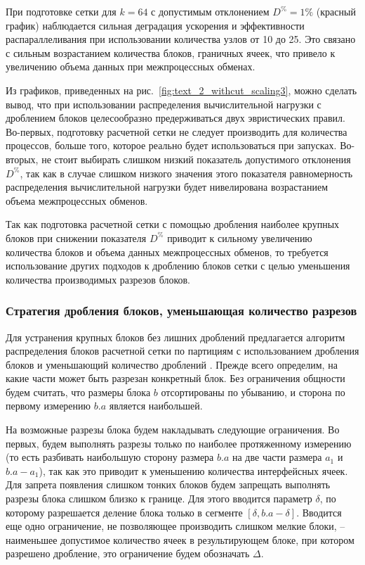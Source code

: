 При подготовке сетки для $k = 64$ с допустимым отклонением $D^{\%} = 1\%$ (красный график) наблюдается сильная деградация ускорения и эффективности распараллеливания при использовании количества узлов от 10 до 25.
Это связано с сильным возрастанием количества блоков, граничных ячеек, что привело к увеличению объема данных при межпроцессных обменах.

Из графиков, приведенных на рис.~\ref{fig:text_2_withcut_scaling3}, можно сделать вывод, что при использовании распределения вычислительной нагрузки с дроблением блоков целесообразно предерживаться двух эвристических правил.
Во-первых, подготовку расчетной сетки не следует производить для количества процессов, больше того, которое реально будет использоваться при запусках.
Во-вторых, не стоит выбирать слишком низкий показатель допустимого отклонения $D^{\%}$, так как в случае слишком низкого значения этого показателя равномерность распределения вычислительной нагрузки будет нивелирована возрастанием объема межпроцессных обменов.

Так как подготовка расчетной сетки с помощью дробления наиболее крупных блоков при снижении показателя $D^{\%}$ приводит к сильному увеличению количества блоков и объема данных межпроцессных обменов, то требуется использование других подходов к дроблению блоков сетки с целью уменьшения количества производимых разрезов блоков.

\subsubsection{Стратегия дробления блоков, уменьшающая количество \mbox{разрезов}}

Для устранения крупных блоков без лишних дроблений предлагается алгоритм распределения блоков расчетной сетки по партициям с использованием дробления блоков и уменьшающий количество дроблений \cite{Bendersky2017Eff,Bendersky2018Block}.
Прежде всего определим, на какие части может быть разрезан конкретный блок.
Без ограничения общности будем считать, что размеры блока $b$ отсортированы по убыванию, и сторона по первому измерению $b.a$ является наибольшей.

На возможные разрезы блока будем накладывать следующие ограничения.
Во первых, будем выполнять разрезы только по наиболее протяженному измерению (то есть разбивать наибольшую сторону размера $b.a$ на две части размера $a_1$ и $b.a - a_1$), так как это приводит к уменьшению количества интерфейсных ячеек.
Для запрета появления слишком тонких блоков будем запрещать выполнять разрезы блока слишком близко к границе.
Для этого вводится параметр $\delta$, по которому разрешается деление блока только в сегменте $[\delta, b.a - \delta]$.
Вводится еще одно ограничение, не позволяющее производить слишком мелкие блоки, -- наименьшее допустимое количество ячеек в результирующем блоке, при котором разрешено дробление, это ограничение будем обозначать $\Delta$.

